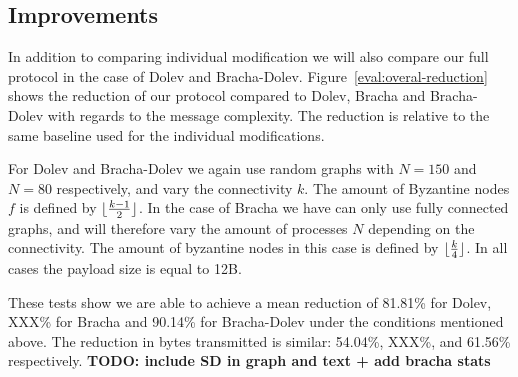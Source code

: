 
\subsection{Improvements}
In addition to comparing individual modification we will also compare our full protocol in the case of Dolev and Bracha-Dolev. Figure~\ref{eval:overal-reduction} shows the reduction of our protocol compared to Dolev, Bracha and Bracha-Dolev with regards to the message complexity. The reduction is relative to the same baseline used for the individual modifications.

For Dolev and Bracha-Dolev we again use random graphs with $N=150$ and $N=80$ respectively, and vary the connectivity $k$. The amount of Byzantine nodes $f$ is defined by $\lfloor\frac{k-1}{2}\rfloor$. In the case of Bracha we have can only use fully connected graphs, and will therefore vary the amount of processes $N$ depending on the connectivity. The amount of byzantine nodes in this case is defined by $\lfloor\frac{k}{4}\rfloor$. In all cases the payload size is equal to 12B. 

These tests show we are able to achieve a mean reduction of 81.81\% for Dolev, XXX\% for Bracha and 90.14\% for Bracha-Dolev under the conditions mentioned above. The reduction in bytes transmitted is similar: 54.04\%, XXX\%, and 61.56\% respectively. \textbf{TODO: include SD in graph and text + add bracha stats}

